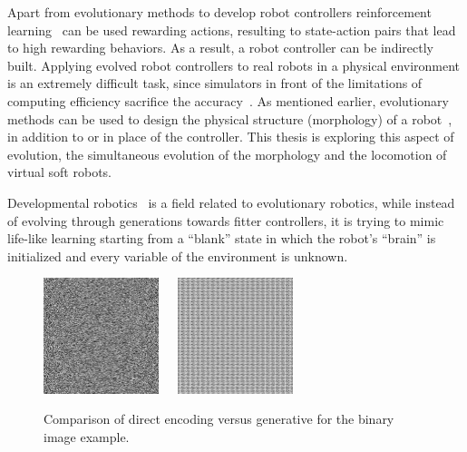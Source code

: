 Apart from evolutionary methods to develop robot controllers reinforcement learning~\citep{hayes1994robot,mahadevan1992automatic} can be used rewarding actions, resulting to state-action pairs that lead to high rewarding behaviors. As a result, a robot controller can be indirectly built. Applying evolved robot controllers to real robots in a physical environment is an extremely difficult task, since simulators in front of the limitations of computing efficiency sacrifice the accuracy~\citep{jakobi1995noise}. As mentioned earlier, evolutionary methods can be used to design the physical structure (morphology) of a robot~\citep{hiller2010evolving}, in addition to or in place of the controller. This thesis is exploring this aspect of evolution, the simultaneous evolution of the morphology and the locomotion of virtual soft robots. 

Developmental robotics~\citep{lungarella2003developmental,asada2001cognitive,weng2004developmental,asada2009cognitive} is a field related to evolutionary robotics,  while instead of evolving through generations towards fitter controllers, it is trying to mimic life-like learning starting from a ``blank'' state in which the robot's ``brain'' is initialized and every variable of the environment is unknown.

\begin{figure}[t!]
\centering
\includegraphics[width=0.3\textwidth]{../Figures/Misc/direct.jpg}\  \   \   
\includegraphics[width=0.3\textwidth]{../Figures/Misc/indirect.jpg}
\caption{Comparison of direct encoding versus generative for the binary image example.}
\label{fig:directVsIndirectEncoding}
\end{figure}


